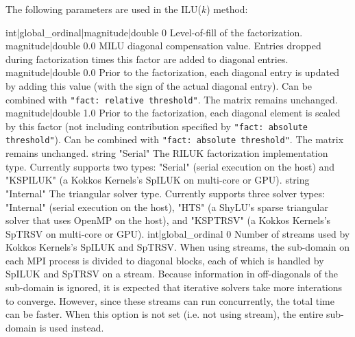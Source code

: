 The following parameters are used in the ILU($k$) method:

    {int|global\_ordinal|magnitude|double}
    {0}
    {Level-of-fill of the factorization.}
    {magnitude|double}
    {0.0}
    {MILU diagonal compensation value. Entries dropped during factorization
     times this factor are added to diagonal entries.}
    {magnitude|double}
    {0.0}
    {Prior to the factorization, each diagonal entry is updated by adding
     this value (with the sign of the actual diagonal entry). Can be combined
     with {\tt "fact: relative threshold"}. The matrix remains unchanged.}
    {magnitude|double}
    {1.0}
    {Prior to the factorization, each diagonal element is scaled by this factor
     (not including contribution specified by {\tt "fact: absolute
     threshold"}). Can be combined with {\tt "fact: absolute threshold"}.
     The matrix remains unchanged.}
     {string}
     {"Serial"}
     {The RILUK factorization implementation type. Currently supports two types:
      "Serial" (serial execution on the host) and "KSPILUK" (a Kokkos Kernels's
      SpILUK on multi-core or GPU).}
     {string}
     {"Internal"}
     {The triangular solver type. Currently supports three solver types:
      "Internal" (serial execution on the host), "HTS" (a ShyLU's sparse
      triangular solver that uses OpenMP on the host), and "KSPTRSV" (a Kokkos
      Kernels's SpTRSV on multi-core or GPU).}
     {int|global\_ordinal}
     {0}
     {Number of streams used by Kokkos Kernels's SpILUK and SpTRSV. When using
      streams, the sub-domain on each MPI process is divided to diagonal blocks,
      each of which is handled by SpILUK and SpTRSV on a stream. Because
      information in off-diagonals of the sub-domain is ignored, it is expected
      that iterative solvers take more interations to converge. However, since
      these streams can run concurrently, the total time can be faster. When
      this option is not set (i.e. not using stream), the entire sub-domain is
      used instead.}
%
%
%
%

